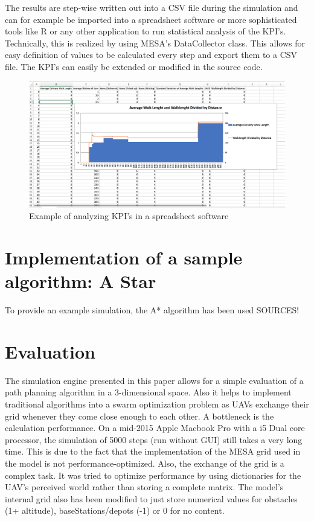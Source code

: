 The results are step-wise written out into a CSV file during the simulation and can for example be imported into a spreadsheet software or more sophisticated tools like R or any other application to run statistical analysis of the KPI's. Technically, this is realized by using MESA's DataCollector class. This allows for easy definition of values to be calculated every step and export them to a CSV file. The KPI's can easily be extended or modified in the source code.

\begin{figure}[htbp]
	\centering
	\includegraphics[scale=0.4]{images/walk}
	\caption{Example of analyzing KPI's in a spreadsheet software}
\end{figure}



\section{Implementation of a sample algorithm: A Star}\label{sec:algorithm}
To provide an example simulation, the A* algorithm has been used 
SOURCES!


\section{Evaluation}
The simulation engine presented in this paper allows for a simple evaluation of a path planning algorithm in a 3-dimensional space. Also it helps to implement traditional algorithms into a swarm optimization problem as UAVs exchange their grid whenever they come close enough to each other. A bottleneck is the calculation performance. On a mid-2015 Apple Macbook Pro with a i5 Dual core processor, the simulation of 5000 steps (run without GUI) still takes a very long time. This is due to the fact that the implementation of the MESA grid used in the model is not performance-optimized. Also, the exchange of the grid is a complex task. It was tried to optimize performance by using dictionaries for the UAV's perceived world rather than storing a complete matrix. The model's internal grid also has been modified to just store numerical values for obstacles (1+ altitude), baseStations/depots (-1) or 0 for no content.

